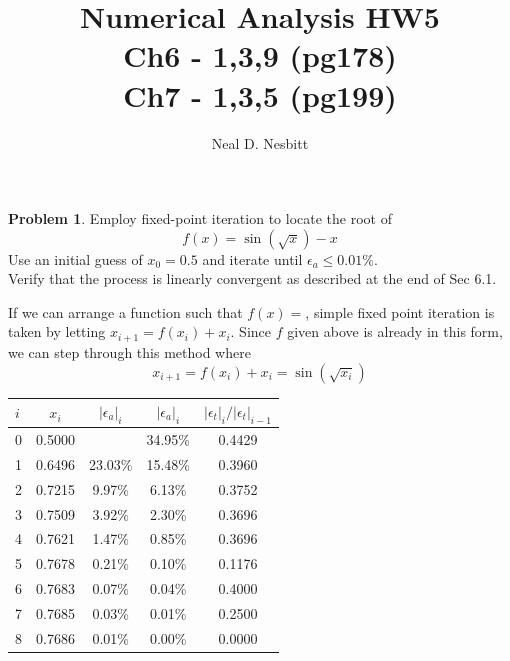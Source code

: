 \documentclass{article}
\title{Numerical Analysis HW5\\
Ch6 - 1,3,9 (pg178)\\
Ch7 - 1,3,5 (pg199)\\}
\author{Neal D. Nesbitt}
\begin{document}
\maketitle

\theoremstyle{definition}
\newtheorem{problem}{Problem}

		
\begin{problem}
	Employ fixed-point iteration to locate the root of
	\[ f(x) = \sin\left(\sqrt{x}\right)-x \]
	Use an initial guess of $x_{0}=0.5$ and iterate until $\epsilon_{a}\le 0.01\%$.\\
	Verify that the process is linearly convergent as described at the end of Sec 6.1.	
\end{problem}

If we can arrange a function such that $f(x)=$, simple fixed point iteration is taken by letting $x_{i+1}=f(x_{i})+x_{i}$. Since $f$ given above is already in this form, we can step through this method where
\[ x_{i+1} = f(x_{i}) + x_{i} = \sin\left( \sqrt{x_{i}} \right) \]
\begin{center}
	\begin{tabular}{|l c c c c|}
\hline
$i$	&	$x_{i}$	&	$\left| \epsilon_{a} \right|_{i}$	&	$\left| \epsilon_{a} \right|_{i}$	&	$\left| \epsilon_{t} \right|_{i}/\left| \epsilon_{t} \right|_{i-1}$\\ \hline
0	&	0.5000	&										&	34.95\%								&	0.4429\\
1	&	0.6496	&	23.03\%								&	15.48\%								&	0.3960\\
2	&	0.7215	&	9.97\%								&	6.13\%								&	0.3752\\
3	&	0.7509	&	3.92\%								&	2.30\%								&	0.3696\\
4	&	0.7621	&	1.47\%								&	0.85\%								&	0.3696\\
5	&	0.7678	&	0.21\%								&	0.10\%								&	0.1176\\
6	&	0.7683	&	0.07\%								&	0.04\%								&	0.4000\\
7	&	0.7685	&	0.03\%								&	0.01\%								&	0.2500\\
8	&	0.7686	&	0.01\%								&	0.00\%								&	0.0000\\
\hline
	\end{tabular}
\end{center}
\end{document}
